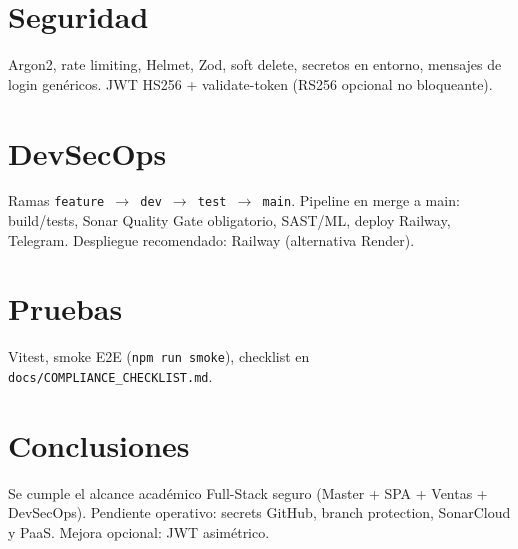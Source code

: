 \section{Seguridad}
Argon2, rate limiting, Helmet, Zod, soft delete, secretos en entorno, mensajes
de login genéricos. JWT HS256 + validate-token (RS256 opcional no bloqueante).

\section{DevSecOps}
Ramas \texttt{feature $\rightarrow$ dev $\rightarrow$ test $\rightarrow$ main}.
Pipeline en merge a main: build/tests, Sonar Quality Gate obligatorio, SAST/ML,
deploy Railway, Telegram. Despliegue recomendado: Railway (alternativa Render).

\section{Pruebas}
Vitest, smoke E2E (\texttt{npm run smoke}), checklist en
\texttt{docs/COMPLIANCE\_CHECKLIST.md}.

\section{Conclusiones}
Se cumple el alcance académico Full-Stack seguro (Master + SPA + Ventas + DevSecOps).
Pendiente operativo: secrets GitHub, branch protection, SonarCloud y PaaS.
Mejora opcional: JWT asimétrico.
